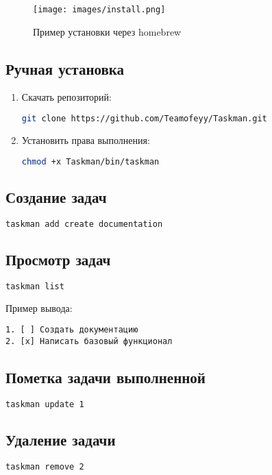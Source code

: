 \documentclass[a4paper,12pt]{article}
\begin{document}
\begin{figure}[h]
  \centering
  \texttt{[image: images/install.png]}
  \caption{Пример установки через homebrew}
  \label{fig:install}
  \end{figure}

\subsection{Ручная установка}
\begin{enumerate}
\item Скачать репозиторий:
\begin{lstlisting}[language=bash]
git clone https://github.com/Teamofeyy/Taskman.git
\end{lstlisting}

\item Установить права выполнения:
\begin{lstlisting}[language=bash]
chmod +x Taskman/bin/taskman
\end{lstlisting}
\end{enumerate}

\subsection{Создание задач}
\begin{lstlisting}[language=bash]
taskman add create documentation
\end{lstlisting}

\subsection{Просмотр задач}
\begin{lstlisting}[language=bash]
taskman list
\end{lstlisting}
Пример вывода:
\begin{verbatim}
1. [ ] Создать документацию
2. [x] Написать базовый функционал
\end{verbatim}

\subsection{Пометка задачи выполненной}
\begin{lstlisting}[language=bash]
taskman update 1
\end{lstlisting}

\subsection{Удаление задачи}
\begin{lstlisting}[language=bash]
taskman remove 2
\end{lstlisting}
\end{document}
